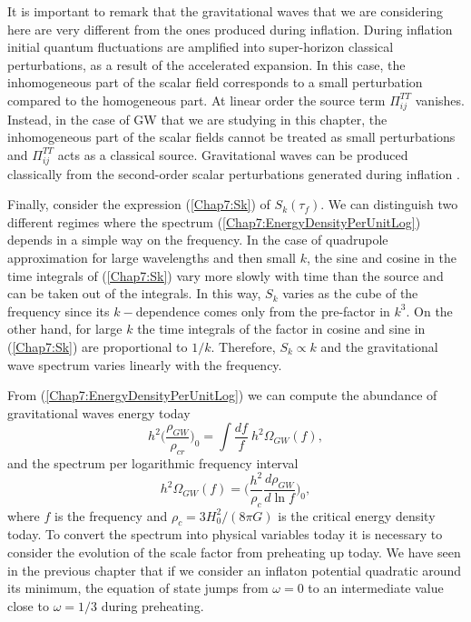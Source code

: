 \documentclass[11pt,a4paper,twoside]{book}
\begin{document}
It is important to remark that the gravitational waves that we are considering here are very different from the ones produced during inflation. During inflation initial quantum fluctuations are amplified into super-horizon classical perturbations, as a result of the accelerated expansion. In this case, the inhomogeneous part of the scalar field corresponds to a small perturbation compared to the homogeneous part. At linear order the source term $ \Pi^{TT}_{ij} $ vanishes. Instead, in the case of GW that we are studying in this chapter, the inhomogeneous part of the scalar fields cannot be treated as small perturbations and $\Pi^{TT}_{ij}$ acts as a classical source. Gravitational waves can be produced classically from the second-order scalar perturbations generated during inflation \cite{GWFromInflation:Intro}.

Finally, consider the expression (\ref{Chap7:Sk}) of $ S_{k}(\tau_{f}) $. We can distinguish two different regimes where the spectrum (\ref{Chap7:EnergyDensityPerUnitLog}) depends in a simple way on the frequency. In the case of quadrupole approximation for large wavelengths and then small $ k $, the sine and cosine in the time integrals of (\ref{Chap7:Sk}) vary more slowly with time than the source and can be taken out of the integrals. In this way, $ S_{k} $ varies as the cube of the frequency since its $ k-$dependence comes only from the pre-factor in $ k^{3} $. On the other hand, for large $ k $ the time integrals of the factor in cosine and sine in (\ref{Chap7:Sk}) are proportional to $ 1/k $. Therefore, $ S_{k} \propto k $ and the gravitational wave spectrum varies linearly with the frequency. 

From (\ref{Chap7:EnergyDensityPerUnitLog}) we can compute the abundance of gravitational waves energy  today
\begin{equation}
\label{Chap7:abundanceEnergyGw}
h^{2}\Bigg(\frac{\rho_{GW}}{\rho_{cr}}\Bigg)_{0}=\int \frac{df}{f}\  h^{2} \Omega_{GW}(f),
\end{equation}
and the spectrum per logarithmic frequency interval
\begin{equation}
\label{Chap7:SpectrumPerLogarithmicInterval}
h^{2}\Omega_{GW}(f) = \Bigg( \frac{h^{2}}{\rho_{c}}\frac{d\rho_{GW}}{d\ln f}   \Bigg)_{0},
\end{equation}
where $ f $ is the frequency and $\rho_{c}=3H_{0}^{2}/(8\pi G)$ is the critical energy density today. To convert the spectrum into physical variables today it is necessary to consider the evolution of the scale factor from preheating up today. We have seen in the previous chapter that if we consider an inflaton potential quadratic around its minimum, the equation of state jumps from $\omega=0$ to an intermediate value close to $\omega=1/3$ during preheating.
\end{document}
